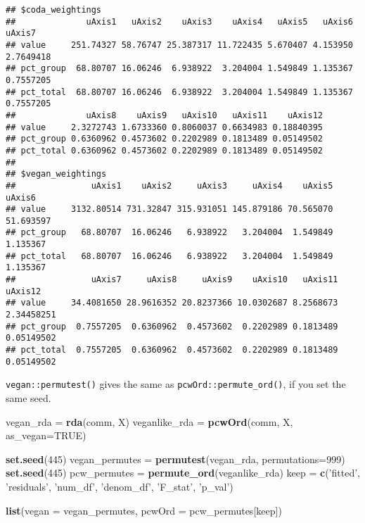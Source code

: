 \documentclass[
]{article}
\newenvironment{Shaded}{\begin{snugshade}}{\end{snugshade}}
\newcommand{\DataTypeTok}[1]{\textcolor[rgb]{0.13,0.29,0.53}{#1}}
\newcommand{\DecValTok}[1]{\textcolor[rgb]{0.00,0.00,0.81}{#1}}
\newcommand{\KeywordTok}[1]{\textcolor[rgb]{0.13,0.29,0.53}{\textbf{#1}}}
\newcommand{\NormalTok}[1]{#1}
\newcommand{\OtherTok}[1]{\textcolor[rgb]{0.56,0.35,0.01}{#1}}
\newcommand{\StringTok}[1]{\textcolor[rgb]{0.31,0.60,0.02}{#1}}
\begin{document}
\begin{verbatim}
## $coda_weightings
##              uAxis1   uAxis2    uAxis3    uAxis4   uAxis5   uAxis6    uAxis7
## value     251.74327 58.76747 25.387317 11.722435 5.670407 4.153950 2.7649418
## pct_group  68.80707 16.06246  6.938922  3.204004 1.549849 1.135367 0.7557205
## pct_total  68.80707 16.06246  6.938922  3.204004 1.549849 1.135367 0.7557205
##              uAxis8    uAxis9   uAxis10   uAxis11    uAxis12
## value     2.3272743 1.6733360 0.8060037 0.6634983 0.18840395
## pct_group 0.6360962 0.4573602 0.2202989 0.1813489 0.05149502
## pct_total 0.6360962 0.4573602 0.2202989 0.1813489 0.05149502
## 
## $vegan_weightings
##               uAxis1    uAxis2     uAxis3     uAxis4    uAxis5    uAxis6
## value     3132.80514 731.32847 315.931051 145.879186 70.565070 51.693597
## pct_group   68.80707  16.06246   6.938922   3.204004  1.549849  1.135367
## pct_total   68.80707  16.06246   6.938922   3.204004  1.549849  1.135367
##               uAxis7     uAxis8     uAxis9    uAxis10   uAxis11    uAxis12
## value     34.4081650 28.9616352 20.8237366 10.0302687 8.2568673 2.34458251
## pct_group  0.7557205  0.6360962  0.4573602  0.2202989 0.1813489 0.05149502
## pct_total  0.7557205  0.6360962  0.4573602  0.2202989 0.1813489 0.05149502
\end{verbatim}

\texttt{vegan::permutest()} gives the same as
\texttt{pcwOrd::permute\_ord()}, if you set the same seed.

\begin{Shaded}
\begin{Highlighting}[]
\NormalTok{vegan_rda =}\StringTok{ }\KeywordTok{rda}\NormalTok{(comm, X)}
\NormalTok{veganlike_rda =}\StringTok{ }\KeywordTok{pcwOrd}\NormalTok{(comm, X, }\DataTypeTok{as_vegan=}\OtherTok{TRUE}\NormalTok{)}

\KeywordTok{set.seed}\NormalTok{(}\DecValTok{445}\NormalTok{)}
\NormalTok{vegan_permutes =}\StringTok{ }\KeywordTok{permutest}\NormalTok{(vegan_rda, }
                           \DataTypeTok{permutations=}\DecValTok{999}\NormalTok{)}
\KeywordTok{set.seed}\NormalTok{(}\DecValTok{445}\NormalTok{)}
\NormalTok{pcw_permutes =}\StringTok{ }\KeywordTok{permute_ord}\NormalTok{(veganlike_rda)}
\NormalTok{keep =}\StringTok{ }\KeywordTok{c}\NormalTok{(}\StringTok{'fitted'}\NormalTok{, }\StringTok{'residuals'}\NormalTok{, }\StringTok{'num_df'}\NormalTok{, }\StringTok{'denom_df'}\NormalTok{, }\StringTok{'F_stat'}\NormalTok{, }\StringTok{'p_val'}\NormalTok{)}

\KeywordTok{list}\NormalTok{(}\DataTypeTok{vegan =}\NormalTok{ vegan_permutes,}
     \DataTypeTok{pcwOrd =}\NormalTok{ pcw_permutes[keep])}
\end{Highlighting}
\end{Shaded}
\end{document}
